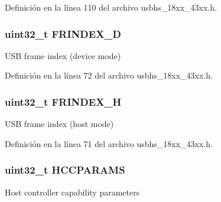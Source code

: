 Definición en la línea 110 del archivo usbhs\+\_\+18xx\+\_\+43xx.\+h.

\subsubsection[{\texorpdfstring{F\+R\+I\+N\+D\+E\+X\+\_\+D}{FRINDEX_D}}]{ uint32\+\_\+t F\+R\+I\+N\+D\+E\+X\+\_\+D}\hypertarget{struct_l_p_c___u_s_b_h_s___t_a8660cd5f0c2390601da8087c9e5496b1}{}\label{struct_l_p_c___u_s_b_h_s___t_a8660cd5f0c2390601da8087c9e5496b1}
U\+SB frame index (device mode) 

Definición en la línea 72 del archivo usbhs\+\_\+18xx\+\_\+43xx.\+h.

\subsubsection[{\texorpdfstring{F\+R\+I\+N\+D\+E\+X\+\_\+H}{FRINDEX_H}}]{ uint32\+\_\+t F\+R\+I\+N\+D\+E\+X\+\_\+H}\hypertarget{struct_l_p_c___u_s_b_h_s___t_aca60a62e0bc2025ddef5c46243e87a0f}{}\label{struct_l_p_c___u_s_b_h_s___t_aca60a62e0bc2025ddef5c46243e87a0f}
U\+SB frame index (host mode) 

Definición en la línea 71 del archivo usbhs\+\_\+18xx\+\_\+43xx.\+h.

\subsubsection[{\texorpdfstring{H\+C\+C\+P\+A\+R\+A\+MS}{HCCPARAMS}}]{ uint32\+\_\+t H\+C\+C\+P\+A\+R\+A\+MS}\hypertarget{struct_l_p_c___u_s_b_h_s___t_aa2d415865b92e80f9abbb893f15c0bed}{}\label{struct_l_p_c___u_s_b_h_s___t_aa2d415865b92e80f9abbb893f15c0bed}
Host controller capability parameters 

